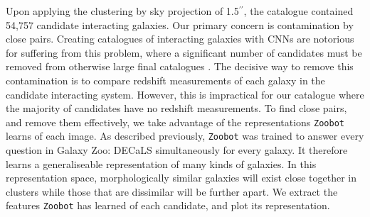Upon applying the clustering by sky projection of 1.5$^{\prime\prime}$, the catalogue contained 54,757 candidate interacting galaxies. Our primary concern is contamination by close pairs. Creating catalogues of interacting galaxies with CNNs are notorious for suffering from this problem, where a significant number of candidates must be removed from otherwise large final catalogues \citep{2019MNRAS.490.5390B, 2022A&A...661A..52P}. The decisive way to remove this contamination is to compare redshift measurements of each galaxy in the candidate interacting system. However, this is impractical for our catalogue where the majority of candidates have no redshift measurements. To find close pairs, and remove them effectively, we take advantage of the representations \texttt{Zoobot} learns of each image. As described previously, \texttt{Zoobot} was trained to answer every question in Galaxy Zoo: DECaLS simultaneously for every galaxy. It therefore learns a generaliseable representation of many kinds of galaxies. In this representation space, morphologically similar galaxies will exist close together in clusters while those that are dissimilar will be further apart. We extract the features \texttt{Zoobot} has learned of each candidate, and plot its representation.

